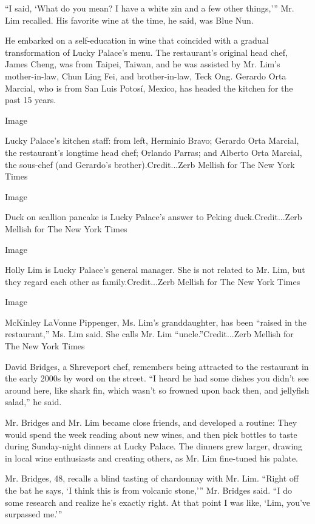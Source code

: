 ``I said, `What do you mean? I have a white zin and a few other
things,''' Mr. Lim recalled. His favorite wine at the time, he said, was
Blue Nun.

He embarked on a self-education in wine that coincided with a gradual
transformation of Lucky Palace's menu. The restaurant's original head
chef, James Cheng, was from Taipei, Taiwan, and he was assisted by Mr.
Lim's mother-in-law, Chun Ling Fei, and brother-in-law, Teck Ong.
Gerardo Orta Marcial, who is from San Luis Potosí, Mexico, has headed
the kitchen for the past 15 years.

Image

Lucky Palace's kitchen staff: from left, Herminio Bravo; Gerardo Orta
Marcial, the restaurant's longtime head chef; Orlando Parras; and
Alberto Orta Marcial, the sous-chef (and Gerardo's
brother).Credit...Zerb Mellish for The New York Times

Image

Duck on scallion pancake is Lucky Palace's answer to Peking
duck.Credit...Zerb Mellish for The New York Times

Image

Holly Lim is Lucky Palace's general manager. She is not related to Mr.
Lim, but they regard each other as family.Credit...Zerb Mellish for The
New York Times

Image

McKinley LaVonne Pippenger, Ms. Lim's granddaughter, has been ``raised
in the restaurant,'' Ms. Lim said. She calls Mr. Lim
``uncle.''Credit...Zerb Mellish for The New York Times

David Bridges, a Shreveport chef, remembers being attracted to the
restaurant in the early 2000s by word on the street. ``I heard he had
some dishes you didn't see around here, like shark fin, which wasn't so
frowned upon back then, and jellyfish salad,'' he said.

Mr. Bridges and Mr. Lim became close friends, and developed a routine:
They would spend the week reading about new wines, and then pick bottles
to taste during Sunday-night dinners at Lucky Palace. The dinners grew
larger, drawing in local wine enthusiasts and creating others, as Mr.
Lim fine-tuned his palate.

Mr. Bridges, 48, recalls a blind tasting of chardonnay with Mr. Lim.
``Right off the bat he says, `I think this is from volcanic stone,'''
Mr. Bridges said. ``I do some research and realize he's exactly right.
At that point I was like, `Lim, you've surpassed me.'''

